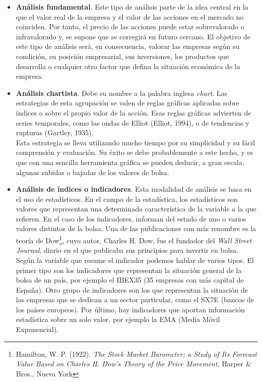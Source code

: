 \begin{itemize}
	\item \textbf{An\'alisis fundamental}. Este tipo de an\'alisis parte de la idea central en la que el valor real de la empresa y el valor de las acciones en el mercado no coinciden. Por tanto, el precio de las acciones puede estar sobrevalorado o infravalorado y, se supone que se corregir\'a en futuro cercano. El objetivo de este tipo de an\'alisis ser\'a, en consecuencia, valorar las empresas seg\'un su condici\'on, su posici\'on empresarial, sus inversiones, los productos que desarrolla o cualquier otro factor que defina la situaci\'on econ\'omica de la empresa.
    \item \textbf{An\'alisis chartista}. Debe su nombre a la palabra inglesa \textit{chart}. Las estrategias de esta agrupaci\'on se valen de reglas gr\'aficas aplicadas sobre \'indices o sobre el propio valor de la acci\'on. Esas reglas gr\'aficas advierten de series temporales, como las ondas de Elliot (Elliot, 1994), o de tendencias y rupturas (Gartley, 1935). \\
    
    Esta estrategia se lleva utilizando mucho tiempo por su simplicidad y su f\'acil comprensi\'on y evaluaci\'on.
    Su \'exito se debe probablemente a este hecho, y es que con una sencilla herramienta gr\'afica se pueden deducir, a gran escala, algunas subidas o bajadas de los valores de bolsa.
    
    \item \textbf{An\'alisis de \'indices o indicadores}. Esta modalidad de an\'alisis se basa en el uso de estad\'isticos. En el campo de la estad\'istica, los estad\'isticos son valores que representan una determinada caracter\'istica de la variable a la que refieren. En el caso de los indicadores, informan del estado de uno o varios valores distintos de la bolsa. Una de las publicaciones con m\'as renombre es la teor\'ia de Dow\footnote{Hamilton, W. P. (1922). \textit{The Stock Market Barometer; a Study of Its Forecast Value Based on Charles H. Dow's Theory of the Price Movement}, Harper \& Bros., Nueva York}, cuyo autor, Charles H. Dow, fue el fundador del \textit{Wall Street Journal}, diario en el que publicaba sus principios para invertir en bolsa. \\
    
    Seg\'un la variable que resume el indicador podemos hablar de varios tipos. El primer tipo son los indicadores que representan la situaci\'on general de la bolsa de un pa\'is, por ejemplo el IBEX35 (35 empresas con m\'as capital de Espa\~na). Otro grupo de indicadores son los que representan la situaci\'on de las empresas que se dedican a un sector particular, como el  SX7E (bancos de los pa\'ises europeos).
    Por \'ultimo, hay indicadores que aportan informaci\'on estad\'istica sobre un solo valor, por ejemplo la EMA (Media M\'ovil Exponencial).
\end{itemize}

